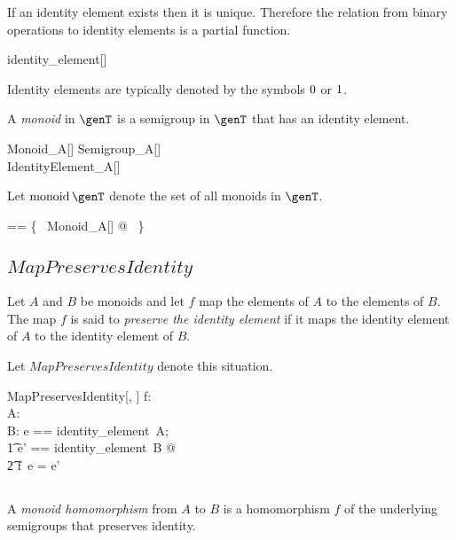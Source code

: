 \documentclass{amsart}
\begin{document}
\begin{remark}
If an identity element exists then it is unique.
Therefore the relation from binary operations to identity elements is a partial function.

\begin{zed}
identity\_element[\setT] \in \binop \setT \pfun \setT
\end{zed}

\end{remark}

Identity elements are typically denoted by the symbols  $0$ or $1$.

A {\em monoid} in $\genT$ is a semigroup in $\genT$ that has an identity element.
\begin{schema}{Monoid\_A}[\genT]
	Semigroup\_A[\genT] \\
	IdentityElement\_A[\genT]
\end{schema}

Let $\monoid \genT$ denote the set of all monoids in $\genT$.
\begin{zed}
	\monoid \genT == \{~ Monoid\_A[\genT] @ \strucA ~\}
\end{zed}


\subsection{$MapPreservesIdentity$}

Let $A$ and $B$ be monoids and let $f$ map the elements of $A$ to the elements of $B$.
The map $f$ is said to {\em preserve the identity element} if it maps the identity element of $A$
to the identity element of $B$.

Let $MapPreservesIdentity$ denote this situation.

\begin{schema}{MapPreservesIdentity}[\genT, \genU]
f: \genT \pfun \genU \\
A: \monoid \genT \\
B: \monoid \genU
\where
\LET e == identity\_element~A; \\
\t1	e' == identity\_element~B @ \\
\t2		f~e = e'
\end{schema}

\subsection{}

A {\em monoid homomorphism} from $A$ to $B$ is a homomorphism $f$ of the underlying semigroups
that preserves identity.
\end{document}
